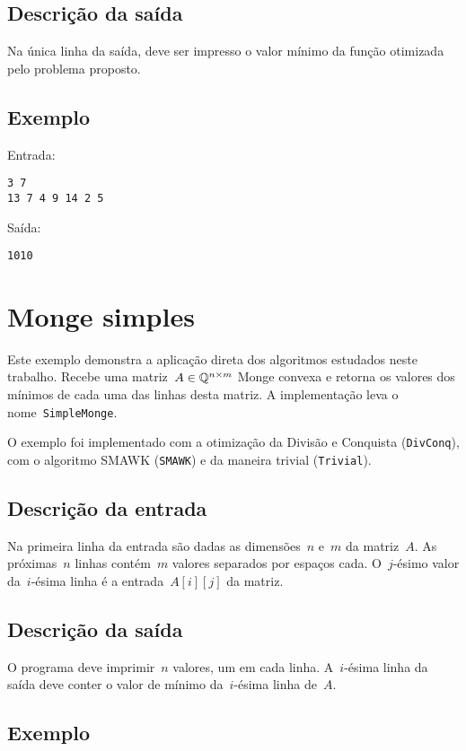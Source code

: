 \subsection{Descrição da saída}
Na única linha da saída, deve ser impresso o valor mínimo da função otimizada pelo problema proposto.

\subsection{Exemplo}
Entrada:
\begin{verbatim}
3 7
13 7 4 9 14 2 5
\end{verbatim}
Saída:
\begin{verbatim}
1010
\end{verbatim}

\section{Monge simples} \label{SimpleMonge}

Este exemplo demonstra a aplicação direta dos algoritmos estudados neste trabalho. Recebe uma matriz~$A \in \mathbb{Q}^{n \times m}$ Monge convexa e retorna os valores dos mínimos de cada uma das linhas desta matriz. A implementação leva o nome~\texttt{SimpleMonge}.

O exemplo foi implementado com a otimização da Divisão e Conquista (\texttt{DivConq}), com o algoritmo SMAWK (\texttt{SMAWK}) e da maneira trivial (\texttt{Trivial}).

\subsection{Descrição da entrada}

Na primeira linha da entrada são dadas as dimensões~$n$ e~$m$ da matriz~$A$. As próximas~$n$ linhas contém~$m$ valores separados por espaços cada. O~$j$-ésimo valor da~$i$-ésima linha é a entrada~$A[i][j]$ da matriz.

\subsection{Descrição da saída}

O programa deve imprimir~$n$ valores, um em cada linha. A~$i$-ésima linha da saída deve conter o valor de mínimo da~$i$-ésima linha de~$A$.

\subsection{Exemplo}

